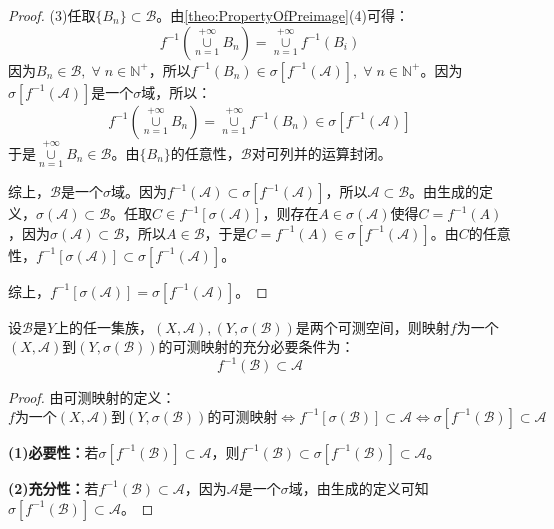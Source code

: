 \begin{proof}
	(3)任取$\{B_n\}\subset\mathscr{B}$。由\cref{theo:PropertyOfPreimage}(4)可得：
	\begin{equation*}
		f^{-1}\left(\underset{n=1}{\overset{+\infty}{\cup}}B_n\right)=\underset{n=1}{\overset{+\infty}{\cup}}f^{-1}(B_i)
	\end{equation*}
	因为$B_n\in\mathscr{B},\;\forall\;n\in\mathbb{N}^+$，所以$f^{-1}(B_n)\in\sigma[f^{-1}(\mathscr{A})],\;\forall\;n\in\mathbb{N}^+$。因为$\sigma[f^{-1}(\mathscr{A})]$是一个$\sigma$域，所以：
	\begin{equation*}
		f^{-1}\left(\underset{n=1}{\overset{+\infty}{\cup}}B_n\right)=\underset{n=1}{\overset{+\infty}{\cup}}f^{-1}(B_n)\in\sigma[f^{-1}(\mathscr{A})]
	\end{equation*}
	于是$\underset{n=1}{\overset{+\infty}{\cup}}B_n\in\mathscr{B}$。由$\{B_n\}$的任意性，$\mathscr{B}$对可列并的运算封闭。\par
	综上，$\mathscr{B}$是一个$\sigma$域。因为$f^{-1}(\mathscr{A})\subset\sigma[f^{-1}(\mathscr{A})]$，所以$\mathscr{A}\subset\mathscr{B}$。由生成的定义，$\sigma(\mathscr{A})\subset\mathscr{B}$。任取$C\in f^{-1}[\sigma(\mathscr{A})]$，则存在$A\in\sigma(\mathscr{A})$使得$C=f^{-1}(A)$，因为$\sigma(\mathscr{A})\subset\mathscr{B}$，所以$A\in\mathscr{B}$，于是$C=f^{-1}(A)\in\sigma[f^{-1}(\mathscr{A})]$。由$C$的任意性，$f^{-1}[\sigma(\mathscr{A})]\subset\sigma[f^{-1}(\mathscr{A})]$。\par
	综上，$f^{-1}[\sigma(\mathscr{A})]=\sigma[f^{-1}(\mathscr{A})]$。
\end{proof}
\begin{theorem}\label{theo:SigmaMeasurable}
	设$\mathscr{B}$是$Y$上的任一集族，$(X,\mathscr{A}),(Y,\sigma(\mathscr{B}))$是两个可测空间，则映射$f$为一个$(X,\mathscr{A})$到$(Y,\sigma(\mathscr{B}))$的可测映射的充分必要条件为：
	\begin{equation*}
		f^{-1}(\mathscr{B})\subset\mathscr{A}
	\end{equation*}
\end{theorem}
\begin{proof}
	由可测映射的定义：
	\begin{equation*}
		\text{$f$为一个$(X,\mathscr{A})$到$(Y,\sigma(\mathscr{B}))$的可测映射}
		\Leftrightarrow f^{-1}[\sigma(\mathscr{B})]\subset\mathscr{A}
		\Leftrightarrow
		\sigma[f^{-1}(\mathscr{B})]\subset\mathscr{A}
	\end{equation*}\par
	\textbf{(1)必要性：}若$\sigma[f^{-1}(\mathscr{B})]\subset\mathscr{A}$，则$f^{-1}(\mathscr{B})\subset\sigma[f^{-1}(\mathscr{B})]\subset\mathscr{A}$。\par
	\textbf{(2)充分性：}若$f^{-1}(\mathscr{B})\subset\mathscr{A}$，因为$\mathscr{A}$是一个$\sigma$域，由生成的定义可知$\sigma[f^{-1}(\mathscr{B})]\subset\mathscr{A}$。
\end{proof}
